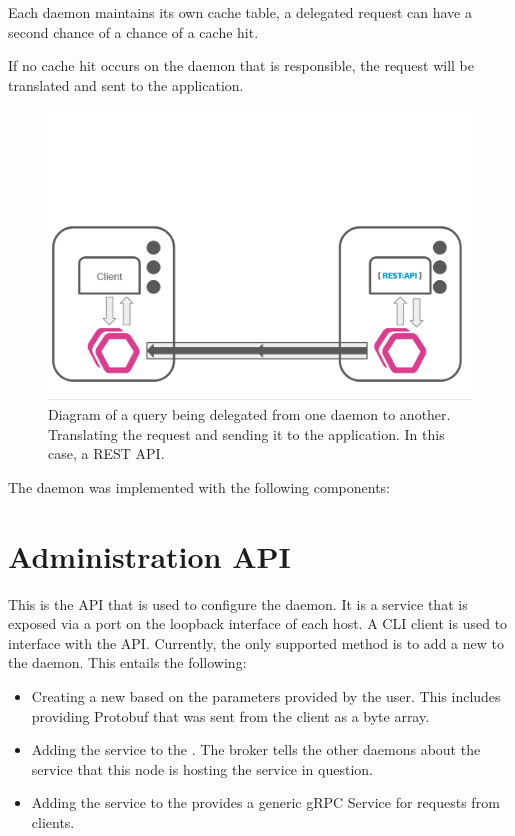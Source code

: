 \documentclass[a4paper,12pt]{report}
\begin{document}
Each daemon maintains its own cache table, a delegated request can have a second chance of a chance of a cache hit.

If no cache hit occurs on the daemon that is responsible, the request will be translated and sent to the application.

\begin{figure}[hbt!]
    \centering
    \includegraphics[width=\linewidth]{delegate.png}
    \caption{Diagram of a query being delegated from one daemon to another. Translating the request and sending it to the application. In this case, a REST API.}
    \label{fig:admin}
\end{figure}

\newpage

The daemon was implemented with the following components:

\section{Administration API}
\label{sec:api}
This is the API that is used to configure the daemon. It is a  service that is exposed via a port on the loopback interface of each host.
A CLI client is used to interface with the API. Currently, the only supported method is to add a new \textit{} to the daemon.
This entails the following:
\begin{itemize}
    \item Creating a new \textit{} based on the parameters provided by the user.
          This includes providing Protobuf that was sent from the client as a byte array.
    \item Adding the service to the \textit{}. The broker tells the other daemons about the service that this
          node is hosting the service in question.
    \item Adding the service to the \textit{} provides a generic gRPC Service for requests from clients.
\end{itemize}
\end{document}
